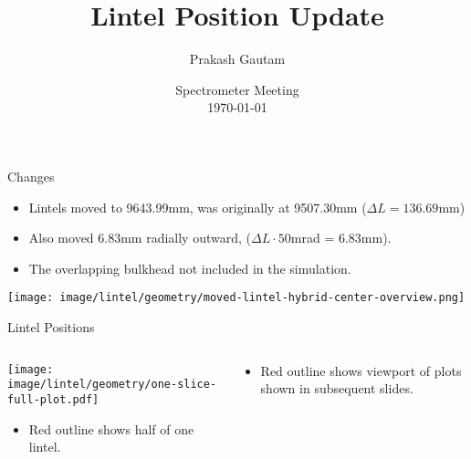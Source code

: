 \documentclass[aspectratio=1610]{beamer}
\title{Lintel Position Update}
\author[P. Gautam]{Prakash Gautam}
\institute[UVa]{}
\date{Spectrometer Meeting \\ \today}
\begin{document}
\begin{frame}
\titlepage
\end{frame}
%
\begin{frame}{Changes}
    \begin{itemize}
        \item Lintels moved to 9643.99mm, was originally at 9507.30mm ($\Delta L = 136.69$mm)
        \item Also moved 6.83mm radially outward, ($\Delta L \cdot 50$mrad = 6.83mm).
        \item The overlapping bulkhead not included in the simulation.
    \end{itemize}
        \texttt{[image: image/lintel/geometry/moved-lintel-hybrid-center-overview.png]}
\end{frame}
%
%
\begin{frame}{Lintel Positions}
    \begin{columns}
        \begin{column}{0.39\textwidth}
            \texttt{[image: image/lintel/geometry/one-slice-full-plot.pdf]}
            \begin{itemize}
                \item Red outline shows half of one lintel.
            \end{itemize}
        \end{column}
        \begin{column}{0.59\textwidth}
            \begin{figure}
                \centering
            \end{figure}
            \begin{itemize}
                \item Red outline shows viewport of plots shown in subsequent slides.
            \end{itemize}
        \end{column}
    \end{columns}
\end{frame}
%
%
\end{document}
